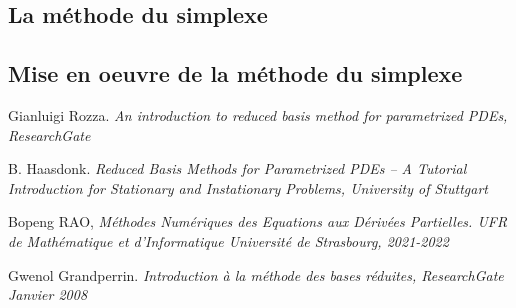 \documentclass[12pt]{article}
\begin{document}






\subsection{La méthode du simplexe}

\subsection{Mise en oeuvre de la méthode du simplexe}




\begin{thebibliography}{9}

Gianluigi Rozza.  \emph{An introduction to reduced basis method for parametrized PDEs, ResearchGate}

B. Haasdonk.  \emph{Reduced Basis Methods for Parametrized PDEs –
A Tutorial Introduction for Stationary and
Instationary Problems, University of Stuttgart  } 



Bopeng RAO,  \emph{ Méthodes Numériques
des Equations aux Dérivées Partielles. UFR de Mathématique et d’Informatique
Université de Strasbourg, 2021-2022 }

Gwenol Grandperrin.  \emph{Introduction à la méthode des bases réduites, ResearchGate Janvier 2008 }

\end{thebibliography}
\end{document}

